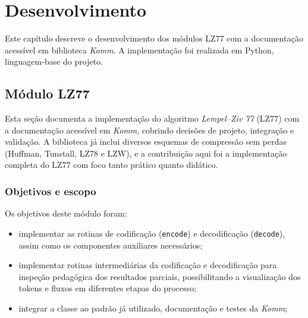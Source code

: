 \chapter{Desenvolvimento}\label{cap:desenvolvimento}

Este capítulo descreve o desenvolvimento dos módulos LZ77 com a documentação
acessível em \url{} biblioteca \textit{Komm}. A implementação foi realizada em
Python, linguagem-base do projeto.

\section{Módulo LZ77}

Esta seção documenta a implementação do algoritmo \textit{Lempel–Ziv 77} (LZ77)
com a documentação acessível em \url{} \textit{Komm}, cobrindo decisões de
projeto, integração e validação. A biblioteca já inclui diversos esquemas de
compressão sem perdas (Huffman, Tunstall, LZ78 e LZW), e a contribuição aqui
foi a implementação completa do LZ77 com foco tanto prático quanto didático.

\subsection{Objetivos e escopo}

Os objetivos deste módulo foram:
\begin{itemize}
    \item implementar as rotinas de codificação (\texttt{encode}) e decodificação
          (\texttt{decode}), assim como os componentes auxiliares necessários;
    \item implementar rotinas intermediárias da codificação e decodificação para inspeção
          pedagógica dos resultados parciais, possibilitando a visualização dos tokens e
          fluxos em diferentes etapas do processo;
    \item integrar a classe ao padrão já utilizado, documentação e testes da
          \textit{Komm};
\end{itemize}



